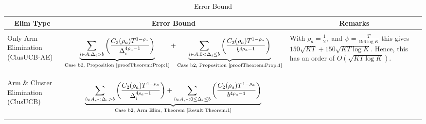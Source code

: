 \begin{table}
\caption{Error Bound}
\label{App:E:table:3}
\begin{center}
\begin{tabular}{p{1.4cm}p{10.3cm}p{3.5cm}}
\multicolumn{1}{c}{\bf Elim Type} &\multicolumn{1}{c}{\bf Error Bound} &\multicolumn{1}{c}{\bf Remarks} \\
\hline \\
Only Arm Elimination (ClusUCB-AE)	& \begin{align*}\underbrace{\sum_{i\in A:\Delta_{i} > b}\bigg(\dfrac{C_{2}(\rho_{a})T^{1-\rho_{a}}}{\Delta_{i}^{4\rho_{a} -1}} \bigg)}_{\text{Case b2, Proposition \ref{proofTheorem:Prop:1}}} + \underbrace{\sum_{i\in A:0 < \Delta_{i}\leq b}\bigg( \dfrac{C_{2}(\rho_{a})T^{1-\rho_{a}}}{b^{4\rho_{a} -1}} \bigg)}_{\text{Case b2, Proposition \ref{proofTheorem:Prop:1}}}\end{align*}  & With $\rho_{a}=\frac{1}{2},$ and $\psi=\frac{T}{196 \log K}$ this gives $150\sqrt{KT}+150\sqrt{KT\log K}$. Hence, this has an order of $O(\sqrt{KT\log K})$.\\
\hline\\
Arm \& Cluster Elimination (ClusUCB) 	& \begin{align*}  \underbrace{\sum_{i\in A_{s^{*}}:\Delta_{i} > b}\bigg(\dfrac{C_{2}(\rho_{a})T^{1-\rho_{a}}}{\Delta_{i}^{4\rho_{a}-1}} \bigg)+ \sum_{i\in A_{s^{*}}:0\leq\Delta_{i}\leq b}\bigg(\dfrac{C_{2}(\rho_{a})T^{1-\rho_{a}}}{b^{4\rho_{a} -1}} \bigg)}_{\text{Case b2, Arm Elim, Theorem \ref{Result:Theorem:1}}}\\   

\end{align*}
\end{tabular}
\end{center}
\end{table}
